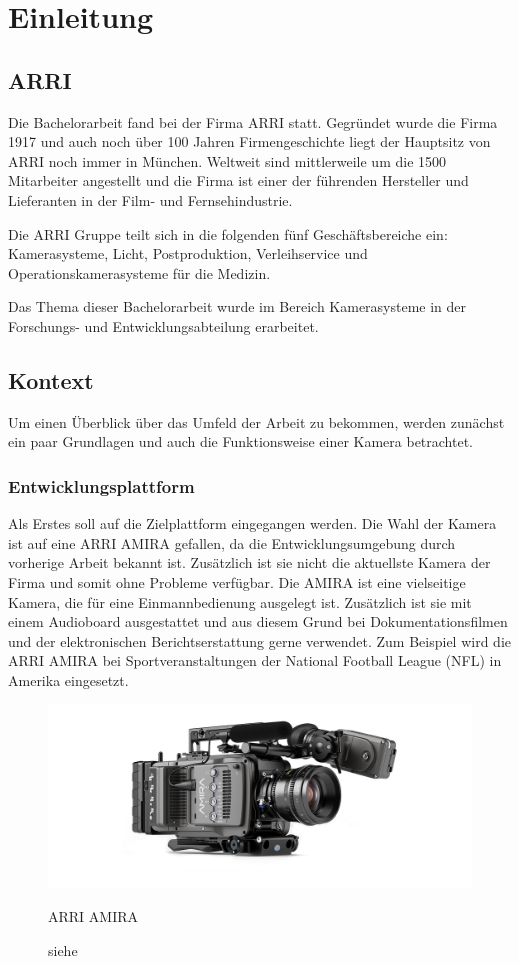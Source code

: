 \chapter{Einleitung}

\section{\acl{ARRI}}
Die Bachelorarbeit fand bei der Firma \acl{ARRI} statt. Gegründet wurde die Firma 1917 und auch noch über 100 Jahren Firmengeschichte liegt der Hauptsitz von \ac{ARRI} noch immer in München. 
Weltweit sind mittlerweile um die 1500 Mitarbeiter angestellt und die Firma ist einer der führenden Hersteller und Lieferanten in der Film- und Fernsehindustrie.

Die \ac{ARRI} Gruppe teilt sich in die folgenden fünf Geschäftsbereiche ein: Kamerasysteme, Licht, Postproduktion, Verleihservice und Operationskamerasysteme für die Medizin. \cite{arricorpinfo}

Das Thema dieser Bachelorarbeit wurde im Bereich Kamerasysteme in der Forschungs- und Entwicklungsabteilung erarbeitet.

\section{Kontext}
Um einen Überblick über das Umfeld der Arbeit zu bekommen, werden zunächst ein paar Grundlagen und auch die Funktionsweise einer Kamera betrachtet.


\subsection{Entwicklungsplattform}
Als Erstes soll auf die Zielplattform eingegangen werden. Die Wahl der Kamera ist auf eine \ac{ARRI} AMIRA gefallen, da die Entwicklungsumgebung durch vorherige Arbeit bekannt ist. Zusätzlich ist sie nicht die aktuellste Kamera der Firma und somit ohne Probleme verfügbar. 
Die AMIRA ist eine vielseitige Kamera, die für eine Einmannbedienung ausgelegt ist. Zusätzlich ist sie mit einem Audioboard ausgestattet und aus diesem Grund bei Dokumentationsfilmen und der elektronischen Berichtserstattung gerne verwendet. Zum Beispiel wird die \ac{ARRI} AMIRA bei Sportveranstaltungen der National Football League (NFL) in Amerika eingesetzt.\cite{arrinewsamira} 

\begin{figure}[!hbtp]
	\centering
	\includegraphics[width = 0.7\linewidth]{pictures/amira-product-image-data.jpg}
	\hspace*{0\textwidth}
	\caption{ARRI AMIRA}
	\caption*{siehe \cite{arriamira_bild}}
	\label{fig:amira}
\end{figure}  

